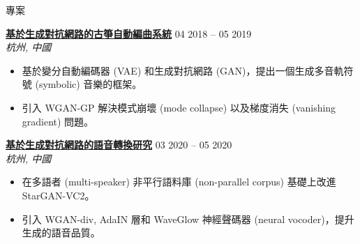 \documentclass{resume}
\begin{document}
\vspace{-1em}
\begin{rSection}{專案}
\vspace{-1.25em}
    \item \textbf{\href{https://docs.google.com/presentation/d/1797idRRmgeD2JnUslGbflmGUO2X5lMY6/edit?usp=drive_link&ouid=101248488395326982475&rtpof=true&sd=true}{\textbf{\large{\underline{基於生成對抗網路的古箏自動編曲系統}}}}} \hfill {04 2018 -- 05 2019}\\
    \mbox{} \hfill \textit{杭州, 中國}
    \vspace{-0.5em}
    \begin{itemize}
        \item 基於變分自動編碼器 (VAE) 和生成對抗網路 (GAN)，提出一個生成多音軌符號 (symbolic) 音樂的框架。
        \item 引入 WGAN-GP 解決模式崩壞 (mode collapse) 以及梯度消失 (vanishing gradient) 問題。
    \end{itemize}

    \item \textbf{\href{https://drive.google.com/file/d/1736XHtaeT58FL_gbOa9XjlyA6xAXDkg2/view?usp=drive_link}{\textbf{\large{\underline{基於生成對抗網路的語音轉換研究}}}}} \hfill {03 2020 -- 05 2020}\\
    \mbox{} \hfill \textit{杭州, 中國}
    \vspace{-0.5em}
    \begin{itemize}
        \item 在多語者 (multi-speaker) 非平行語料庫 (non-parallel corpus) 基礎上改進 StarGAN-VC2。
        \item 引入 WGAN-div, AdaIN 層和 WaveGlow 神經聲碼器 (neural vocoder)，提升生成的語音品質。
    \end{itemize}
    


\end{rSection}
\end{document}
